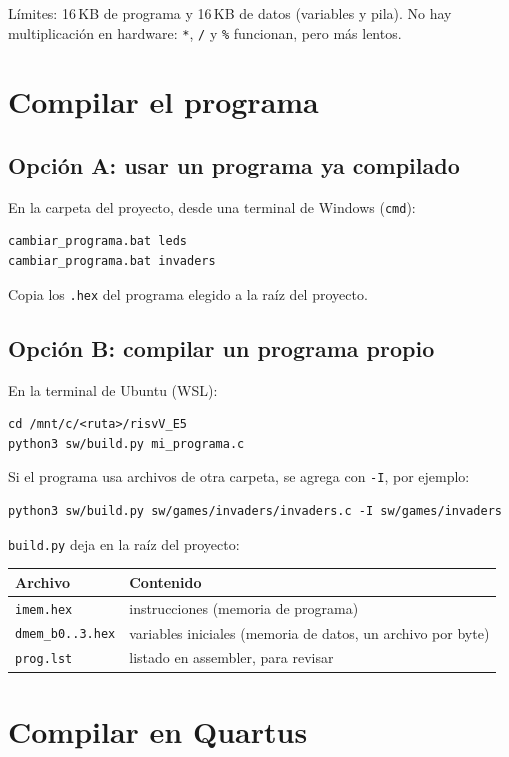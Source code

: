 \documentclass[11pt,a4paper]{article}
\newcommand{\code}[1]{\texttt{#1}}
\begin{document}
Límites: 16\,KB de programa y 16\,KB de datos (variables y pila). No hay multiplicación en hardware: \code{*}, \code{/} y \code{\%} funcionan, pero más lentos.

\section{Compilar el programa}

\subsection{Opción A: usar un programa ya compilado}

En la carpeta del proyecto, desde una terminal de Windows (\code{cmd}):
\begin{lstlisting}
cambiar_programa.bat leds
cambiar_programa.bat invaders
\end{lstlisting}
Copia los \code{.hex} del programa elegido a la raíz del proyecto.

\subsection{Opción B: compilar un programa propio}

En la terminal de Ubuntu (WSL):
\begin{lstlisting}
cd /mnt/c/<ruta>/risvV_E5
python3 sw/build.py mi_programa.c
\end{lstlisting}
Si el programa usa archivos de otra carpeta, se agrega con \code{-I}, por ejemplo:
\begin{lstlisting}
python3 sw/build.py sw/games/invaders/invaders.c -I sw/games/invaders
\end{lstlisting}

\code{build.py} deja en la raíz del proyecto:

\begin{center}
\begin{tabular}{ll}
\toprule
Archivo & Contenido \\
\midrule
\code{imem.hex} & instrucciones (memoria de programa) \\
\code{dmem\_b0..3.hex} & variables iniciales (memoria de datos, un archivo por byte) \\
\code{prog.lst} & listado en assembler, para revisar \\
\bottomrule
\end{tabular}
\end{center}

\section{Compilar en Quartus}
\end{document}
